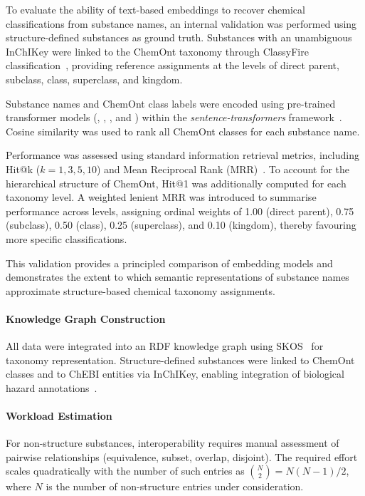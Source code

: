 To evaluate the ability of text-based embeddings to recover chemical
classifications from substance names, an internal validation was performed
using structure-defined substances as ground truth. Substances with an
unambiguous InChIKey were linked to the ChemOnt taxonomy through ClassyFire
classification~\cite{DjoumbouFeunang2016}, providing reference assignments at
the levels of direct parent, subclass, class, superclass, and kingdom.

Substance names and ChemOnt class labels were encoded using pre-trained
transformer models (, ,
, and ) within the \emph{sentence-transformers}
framework~\cite{Reimers2019,Wang2020MiniLM,devlin-etal-2019-bert}. Cosine similarity was used to rank all ChemOnt classes for each substance name.

Performance was assessed using standard information retrieval metrics,
including Hit@k ($k = 1, 3, 5, 10$) and Mean Reciprocal Rank (MRR)~\cite{Manning2008}.
To account for the hierarchical structure of ChemOnt, Hit@1 was additionally
computed for each taxonomy level. A weighted lenient MRR was introduced to
summarise performance across levels, assigning ordinal weights of 1.00 (direct
parent), 0.75 (subclass), 0.50 (class), 0.25 (superclass), and 0.10 (kingdom),
thereby favouring more specific classifications.

This validation provides a principled comparison of embedding models and
demonstrates the extent to which semantic representations of substance names
approximate structure-based chemical taxonomy assignments.

\paragraph{Knowledge Graph Construction}

All data were integrated into an RDF knowledge graph using SKOS~\cite{W3C2009SKOS} for taxonomy
representation. Structure-defined substances were linked to ChemOnt classes and
to ChEBI entities via InChIKey, enabling integration of biological hazard
annotations~\cite{W3C2017OA}.

\paragraph{Workload Estimation}

For non-structure substances, interoperability requires manual assessment of
pairwise relationships (equivalence, subset, overlap, disjoint). The required
effort scales quadratically with the number of such entries as $\binom{N}{2} = N(N-1)/2$, where $N$ is the number of non-structure entries under consideration.

